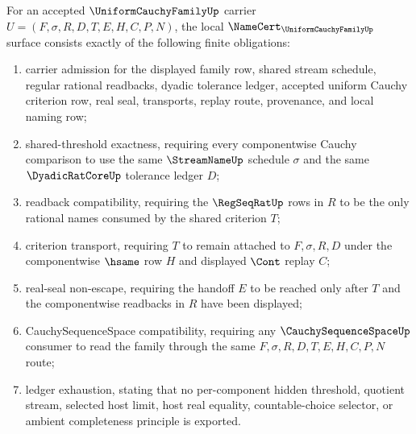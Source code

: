 \begin{theorem}
\label{thm:uniform-cauchy-family-namecert-obligations}
For an accepted $\UniformCauchyFamilyUp$ carrier $U=(F,\sigma,R,D,T,E,H,C,P,N)$, the local $\NameCert_{\UniformCauchyFamilyUp}$ surface consists exactly of the following finite obligations:
\begin{enumerate}
\item carrier admission for the displayed family row, shared stream schedule, regular rational readbacks, dyadic tolerance ledger, accepted uniform Cauchy criterion row, real seal, transports, replay route, provenance, and local naming row;
\item shared-threshold exactness, requiring every componentwise Cauchy comparison to use the same $\StreamNameUp$ schedule $\sigma$ and the same $\DyadicRatCoreUp$ tolerance ledger $D$;
\item readback compatibility, requiring the $\RegSeqRatUp$ rows in $R$ to be the only rational names consumed by the shared criterion $T$;
\item criterion transport, requiring $T$ to remain attached to $F,\sigma,R,D$ under the componentwise $\hsame$ row $H$ and displayed $\Cont$ replay $C$;
\item real-seal non-escape, requiring the handoff $E$ to be reached only after $T$ and the componentwise readbacks in $R$ have been displayed;
\item CauchySequenceSpace compatibility, requiring any $\CauchySequenceSpaceUp$ consumer to read the family through the same $F,\sigma,R,D,T,E,H,C,P,N$ route;
\item ledger exhaustion, stating that no per-component hidden threshold, quotient stream, selected host limit, host real equality, countable-choice selector, or ambient completeness principle is exported.
\end{enumerate}
\end{theorem}
